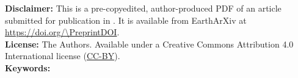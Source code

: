 \documentclass[onecolumn,11pt]{article}
\begin{document}
\maketitle

\begin{abstract}
    
\end{abstract}

\vspace{0.25cm}
{\small
  \noindent
  \textbf{Disclaimer:}
  This is a pre-copyedited, author-produced PDF of an article
  submitted for publication in \textit{\Journal{}}.
  It is available from EarthArXiv at
  \url{https://doi.org/\PreprintDOI}.
  \\[0.25cm]
  \noindent
  \textbf{License:}
  \textcopyright{} \Year{} The Authors.
  Available under a Creative Commons Attribution 4.0 International license
  (\href{https://creativecommons.org/licenses/by/4.0/}{CC-BY}).
  \\[0.25cm]
  \noindent
  \textbf{Keywords:} \Keywords{}
}





\end{document}
